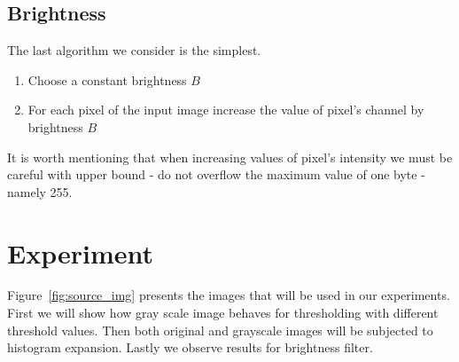 \documentclass{article}
\begin{document}
\subsection{Brightness}
The last algorithm we consider is the simplest.

\begin{enumerate}
	\item Choose a constant brightness $B$
	\item For each pixel of the input image increase the value of pixel's channel by brightness $B$
\end{enumerate}

It is worth mentioning that when increasing values of pixel's intensity we must be careful with upper bound - do not overflow the maximum value of one byte - namely 255.


\section{Experiment}
\label{sec:experiment}

Figure~\ref{fig:source_img} presents the images that will be used in our experiments. First we will show how gray scale image behaves for thresholding with different threshold values. Then both original and grayscale images will be subjected to histogram expansion. Lastly we observe results for brightness filter.
\end{document}
